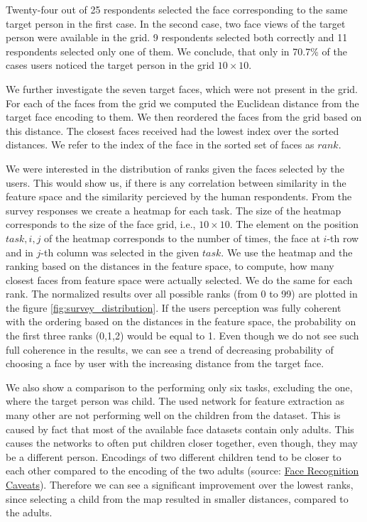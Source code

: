 Twenty-four out of 25 respondents selected the face corresponding to the same target person in the first case. In the second case, two face views of the target person were available in the grid. 9 respondents selected both correctly and 11 respondents selected only one of them. We conclude, that only in 70.7\% of the cases users noticed the target person in the grid $10\times10$.

We further investigate the seven target faces, which were not present in the grid. For each of the faces from the grid we computed the Euclidean distance from the target face encoding  to them. We then reordered the faces from the grid based on this distance. The closest faces received had the lowest index over the sorted distances. We refer to the index of the face in the sorted set of faces as $rank$.

We were interested in the distribution of ranks given the faces selected by the users. This would show us, if there is any correlation between similarity in the feature space and the similarity percieved by the human respondents. From the survey responses we create a heatmap for each task. The size of the heatmap corresponds to the size of the face grid, i.e., $10\times10$. The element on the position $task, i, j$ of the heatmap corresponds to the number of times, the face at $i$-th row and in $j$-th column was selected in the given $task$. We use the heatmap and the ranking based on the distances in the feature space, to compute, how many closest faces from feature space were actually selected. We do the same for each rank. The normalized results over all possible ranks (from 0 to 99) are plotted in the figure \ref{fig:survey_distribution}. If the users perception was fully coherent with the ordering based on the distances in the feature space, the  
probability on the first three ranks (0,1,2) would be equal to 1. Even though we do not see such full coherence in the results, we can see a trend of decreasing probability of choosing a face by user with the increasing distance from the target face.

We also show a comparison to the performing only six tasks, excluding the one, where the target person was child. The used network for feature extraction as many other are not performing well on the children from the dataset. This is caused by fact that most of the available face datasets contain only adults. This causes the networks to often put children closer together, even though, they may be a different person. Encodings of two different children tend to be closer to each other compared to the encoding of the two adults (source: \href{https://face-recognition.readthedocs.io/en/latest/readme.html#caveats}{Face Recognition Caveats}). Therefore we can see a significant improvement over the lowest ranks, since selecting a child from the map resulted in smaller distances, compared to the adults.

